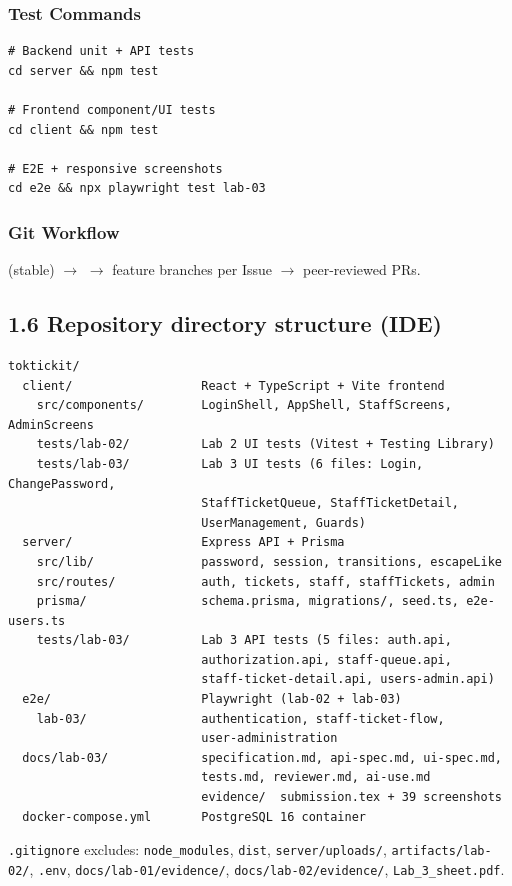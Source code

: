 \documentclass[11pt,a4paper]{article}
\begin{document}
\subsubsection*{Test Commands}
\begin{lstlisting}
# Backend unit + API tests
cd server && npm test

# Frontend component/UI tests
cd client && npm test

# E2E + responsive screenshots
cd e2e && npx playwright test lab-03
\end{lstlisting}

\subsubsection*{Git Workflow}
 (stable) $\to$  $\to$ feature branches per Issue $\to$ peer-reviewed PRs.

\subsection*{1.6 Repository directory structure (IDE)}
\begin{lstlisting}
toktickit/
  client/                  React + TypeScript + Vite frontend
    src/components/        LoginShell, AppShell, StaffScreens, AdminScreens
    tests/lab-02/          Lab 2 UI tests (Vitest + Testing Library)
    tests/lab-03/          Lab 3 UI tests (6 files: Login, ChangePassword,
                           StaffTicketQueue, StaffTicketDetail,
                           UserManagement, Guards)
  server/                  Express API + Prisma
    src/lib/               password, session, transitions, escapeLike
    src/routes/            auth, tickets, staff, staffTickets, admin
    prisma/                schema.prisma, migrations/, seed.ts, e2e-users.ts
    tests/lab-03/          Lab 3 API tests (5 files: auth.api,
                           authorization.api, staff-queue.api,
                           staff-ticket-detail.api, users-admin.api)
  e2e/                     Playwright (lab-02 + lab-03)
    lab-03/                authentication, staff-ticket-flow,
                           user-administration
  docs/lab-03/             specification.md, api-spec.md, ui-spec.md,
                           tests.md, reviewer.md, ai-use.md
                           evidence/  submission.tex + 39 screenshots
  docker-compose.yml       PostgreSQL 16 container
\end{lstlisting}

\texttt{.gitignore} excludes: \texttt{node\_modules}, \texttt{dist}, \texttt{server/uploads/}, \texttt{artifacts/lab-02/}, \texttt{.env}, \texttt{docs/lab-01/evidence/}, \texttt{docs/lab-02/evidence/}, \texttt{Lab\_3\_sheet.pdf}.
\end{document}
